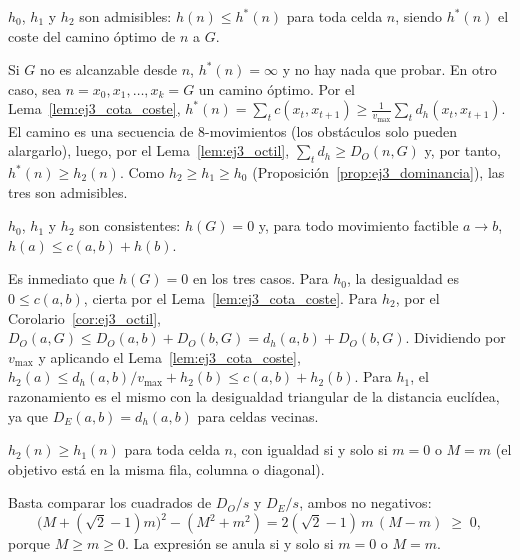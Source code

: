 \begin{proposicion}[Admisibilidad]
\label{prop:ej3_admisible}
$h_0$, $h_1$ y $h_2$ son admisibles: $h(n) \le h^*(n)$ para toda celda $n$,
siendo $h^*(n)$ el coste del camino óptimo de $n$ a $G$.
\end{proposicion}
\begin{IEEEproof}
Si $G$ no es alcanzable desde $n$, $h^*(n) = \infty$ y no hay nada que
probar. En otro caso, sea $n = x_0, x_1, \dots, x_k = G$ un camino óptimo.
Por el Lema~\ref{lem:ej3_cota_coste},
$h^*(n) = \sum_t c(x_t, x_{t+1}) \ge \frac{1}{v_{\max}} \sum_t d_h(x_t, x_{t+1})$.
El camino es una secuencia de 8-movimientos (los obstáculos solo pueden
alargarlo), luego, por el Lema~\ref{lem:ej3_octil},
$\sum_t d_h \ge D_O(n,G)$ y, por tanto, $h^*(n) \ge h_2(n)$. Como
$h_2 \ge h_1 \ge h_0$ (Proposición~\ref{prop:ej3_dominancia}), las tres son
admisibles.
\end{IEEEproof}

\begin{proposicion}[Consistencia]
\label{prop:ej3_consistente}
$h_0$, $h_1$ y $h_2$ son consistentes: $h(G) = 0$ y, para todo movimiento
factible $a \to b$, $h(a) \le c(a,b) + h(b)$.
\end{proposicion}
\begin{IEEEproof}
Es inmediato que $h(G) = 0$ en los tres casos. Para $h_0$, la desigualdad es
$0 \le c(a,b)$, cierta por el Lema~\ref{lem:ej3_cota_coste}. Para $h_2$, por el
Corolario~\ref{cor:ej3_octil},
$D_O(a,G) \le D_O(a,b) + D_O(b,G) = d_h(a,b) + D_O(b,G)$. Dividiendo por
$v_{\max}$ y aplicando el Lema~\ref{lem:ej3_cota_coste},
$h_2(a) \le d_h(a,b)/v_{\max} + h_2(b) \le c(a,b) + h_2(b)$. Para $h_1$,
el razonamiento es el mismo con la desigualdad triangular de la distancia
euclídea, ya que $D_E(a,b) = d_h(a,b)$ para celdas vecinas.
\end{IEEEproof}

\begin{proposicion}[Dominancia]
\label{prop:ej3_dominancia}
$h_2(n) \ge h_1(n)$ para toda celda $n$, con igualdad si y solo si $m = 0$
o $M = m$ (el objetivo está en la misma fila, columna o diagonal).
\end{proposicion}
\begin{IEEEproof}
Basta comparar los cuadrados de $D_O/s$ y $D_E/s$, ambos no negativos:
\[
  \big(M + (\sqrt{2}-1)m\big)^2 - (M^2 + m^2)
  = 2(\sqrt{2}-1)\,m\,(M - m) \;\ge\; 0,
\]
porque $M \ge m \ge 0$. La expresión se anula si y solo si $m = 0$ o $M = m$.
\end{IEEEproof}

